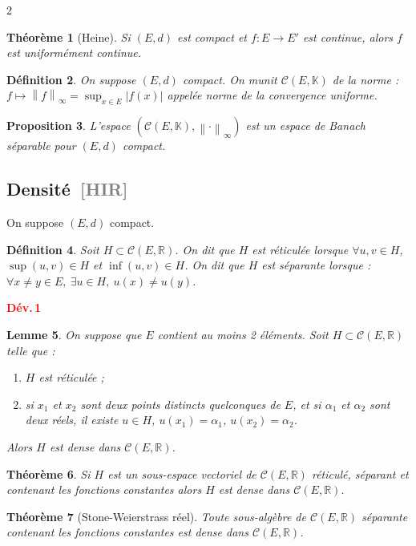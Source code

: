 \documentclass[10pt,a4paper]{article}
\theoremstyle{plan}
\newtheorem{theoreme}{Théorème}
\newtheorem{definition}[theoreme]{Définition}
\newtheorem{proposition}[theoreme]{Proposition}
\newtheorem{lemme}[theoreme]{Lemme}
\theoremstyle{planex}   %
\newcommand{\srcs}[1]{\ {\normalfont\small\textcolor{gray}{[#1]}}}
\newenvironment{devbloc}[1]{\par\smallskip\noindent\begin{lrbox}{\devsavebox}\begin{minipage}{\dimexpr\columnwidth-2\fboxsep-2\fboxrule}\vspace{-2pt}\hfill\textcolor{red}{\textbf{Dév.\,#1}}\par\vspace{-6pt}}{\end{minipage}\end{lrbox}{\color{red}\fbox{\color{black}\usebox{\devsavebox}}}\par\smallskip}
\newcommand{\R}{\mathbb{R}}
\newcommand{\K}{\mathbb{K}}
\newcommand{\Cc}{\mathcal{C}}
\newcommand{\norm}[1]{\left\lVert #1\right\rVert}
\newcommand{\abs}[1]{\left\lvert #1\right\rvert}
\begin{document}
\begin{multicols}{2}
\begin{theoreme}[Heine]
Si $(E,d)$ est compact et $f : E \to E'$ est continue, alors $f$ est uniformément continue.
\end{theoreme}

\begin{definition}
On suppose $(E,d)$ compact. On munit $\Cc(E,\K)$ de la norme : $f \mapsto \norm{f}_\infty = \sup_{x \in E} \abs{f(x)}$ appelée norme de la convergence uniforme.
\end{definition}

\begin{proposition}
L'espace $(\Cc(E,\K), \norm{\cdot}_\infty)$ est un espace de Banach séparable pour $(E,d)$ compact.
\end{proposition}

\subsection{Densité\srcs{HIR}}
On suppose $(E,d)$ compact.

\begin{definition}
Soit $H \subset \Cc(E,\R)$. On dit que $H$ est réticulée lorsque $\forall u, v \in H$, $\sup(u,v) \in H$ et $\inf(u,v) \in H$. On dit que $H$ est séparante lorsque : $\forall x \ne y \in E,\ \exists u \in H,\ u(x) \ne u(y)$.
\end{definition}

\begin{devbloc}{1}
\begin{lemme}
On suppose que $E$ contient au moins 2 éléments. Soit $H \subset \Cc(E,\R)$ telle que :
\begin{enumerate}
\item $H$ est réticulée ;
\item si $x_1$ et $x_2$ sont deux points distincts quelconques de $E$, et si $\alpha_1$ et $\alpha_2$ sont deux réels, il existe $u \in H$, $u(x_1) = \alpha_1$, $u(x_2) = \alpha_2$.
\end{enumerate}
Alors $H$ est dense dans $\Cc(E,\R)$.
\end{lemme}
\begin{theoreme}
Si $H$ est un sous-espace vectoriel de $\Cc(E,\R)$ réticulé, séparant et contenant les fonctions constantes alors $H$ est dense dans $\Cc(E,\R)$.
\end{theoreme}
\begin{theoreme}[Stone-Weierstrass réel]
Toute sous-algèbre de $\Cc(E,\R)$ séparante contenant les fonctions constantes est dense dans $\Cc(E,\R)$.
\end{theoreme}
\end{devbloc}


\end{multicols}
\end{document}
